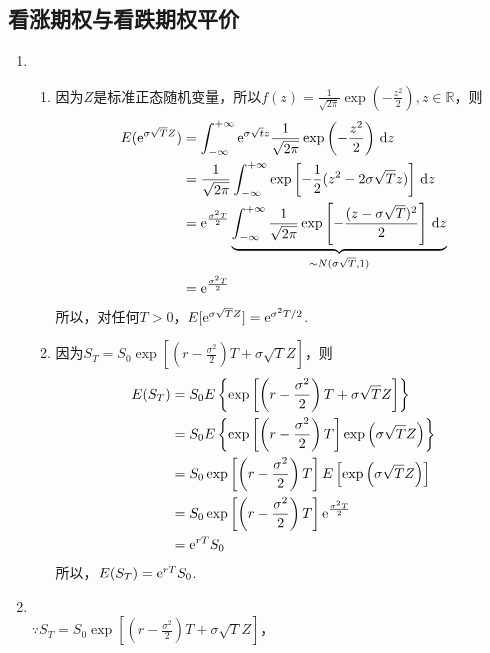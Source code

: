 \subsection{看涨期权与看跌期权平价}
\begin{enumerate}
    \item \pro
    \begin{enumerate}[label=(\alph*)]
        \item 因为$Z$是标准正态随机变量，所以$\displaystyle f(z)= \frac{1}{\sqrt{2\pi}} \exp\left(-\frac{z^2}{2}\right), z \in \mathbb{R}$，则
        \begin{align*}
            E(\mathrm{e}^{\sigma \sqrt{T} Z}) & = \int_{-\infty}^{+\infty} \mathrm{e}^{\sigma \sqrt{t} z} \frac{1}{\sqrt{2\pi}} \exp\left(-\frac{z^2}{2}\right)\,\mathrm{d} z\\
            & = \frac{1}{\sqrt{2\pi}} \int_{-\infty}^{+\infty} \exp \left[-\frac{1}{2}(z^2-2\sigma\sqrt{T}z)\right]\,\mathrm{d} z\\
            & = \mathrm{e}^{\frac{\sigma^2T}{2}} \underbrace{\int_{-\infty}^{+\infty} \frac{1}{\sqrt{2\pi}} \exp\left[-\frac{(z-\sigma\sqrt{T})^2}{2}\right]\,\mathrm{d} z}_{\sim N(\sigma\sqrt{T}, 1)}\\
            & = \mathrm{e}^{\frac{\sigma^2T}{2}}
        \end{align*}
        所以，对任何$T>0$，$E[\mathrm{e}^{\sigma \sqrt{T} Z}] = \mathrm{e}^{\sigma^2T/2}$.
        \item 因为$\displaystyle S_T = S_0 \exp\left[\left(r-\frac{\sigma^2}{2}\right)T+\sigma\sqrt{T}Z\right]$，则
        \begin{align*}
            E(S_T) & = S_0 E\left\{\exp\left[\left(r-\frac{\sigma^2}{2}\right)T+\sigma\sqrt{T}Z\right]\right\}\\
            & = S_0 E\left\{\exp\left[\left(r-\frac{\sigma^2}{2}\right)T\right]\exp\left(\sigma\sqrt{T}Z\right)\right\}\\
            & = S_0 \exp\left[\left(r-\frac{\sigma^2}{2}\right)T\right]E\left[\exp\left(\sigma\sqrt{T}Z\right)\right]\\
            & = S_0 \exp\left[\left(r-\frac{\sigma^2}{2}\right)T\right]\mathrm{e}^{\frac{\sigma^2T}{2}}\\
            & = \mathrm{e}^{rT}S_0
        \end{align*}
        所以，$E(S_T) = \mathrm{e}^{rT}S_0$.
    \end{enumerate}
    \item \pro\\
    $\displaystyle \because S_T = S_0 \exp\left[\left(r-\frac{\sigma^2}{2}\right)T+\sigma\sqrt{T}Z\right]$，\\

\end{enumerate}

